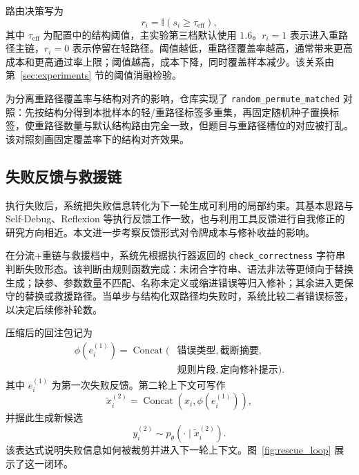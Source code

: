 路由决策写为
\begin{equation}
    r_i=\mathbb{I}(s_i\ge \tau_{\mathrm{eff}}),
\end{equation}
其中 $\tau_{\mathrm{eff}}$ 为配置中的结构阈值，主实验第三档默认使用 $1.6$。$r_i=1$ 表示进入重路径主链，$r_i=0$ 表示停留在轻路径。阈值越低，重路径覆盖率越高，通常带来更高成本和更高通过率上限；阈值越高，成本下降，同时覆盖样本减少。该关系由第~\ref{sec:experiments} 节的阈值消融检验。

为分离重路径覆盖率与结构对齐的影响，仓库实现了 \texttt{random\_permute\_matched} 对照：先按结构分得到本批样本的轻/重路径标签多重集，再固定随机种子置换标签，使重路径数量与默认结构路由完全一致，但题目与重路径槽位的对应被打乱。该对照刻画固定覆盖率下的结构对齐效果。

\subsection{失败反馈与救援链}
\label{sec:rescue}

执行失败后，系统把失败信息转化为下一轮生成可利用的局部约束。其基本思路与 Self-Debug、Reflexion 等执行反馈工作一致\cite{chen2024selfdebug,shinn2023reflexion}，也与利用工具反馈进行自我修正的研究方向相近\cite{gou2024critic,madaan2023selfrefine}。本文进一步考察反馈形式对令牌成本与修补收益的影响。

在分流+重链与救援档中，系统先根据执行器返回的 \texttt{check\_correctness} 字符串判断失败形态。该判断由规则函数完成：未闭合字符串、语法非法等更倾向于替换生成；缺参、参数数量不匹配、名称未定义或缩进错误等归入修补；其余进入更保守的替换或救援路径。当单步与结构化双路径均失败时，系统比较二者错误标签，以决定后续修补轮数。

压缩后的回注包记为
\begin{equation}
\begin{aligned}
\phi(e_i^{(1)})=\operatorname{Concat}\bigl(&
\textit{错误类型},
\textit{截断摘要},\\
&
\textit{规则片段},
\textit{定向修补提示}
\bigr).
\end{aligned}
\end{equation}
其中 $e_i^{(1)}$ 为第一次失败反馈。第二轮上下文可写作
\begin{equation}
\tilde{x}_i^{(2)}=\operatorname{Concat}(x_i,\phi(e_i^{(1)})),
\end{equation}
并据此生成新候选
\begin{equation}
y_i^{(2)} \sim p_{\theta}(\cdot\mid \tilde{x}_i^{(2)}).
\end{equation}
该表达式说明失败信息如何被裁剪并进入下一轮上下文。图~\ref{fig:rescue_loop} 展示了这一闭环。

